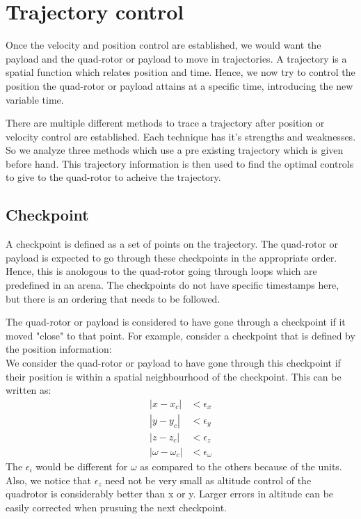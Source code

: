 \documentclass[BTech]{iitmdiss}
\begin{document}
\chapter{Trajectory control}

Once the velocity and position control are established, we would want the payload and the quad-rotor or payload to move in trajectories. A trajectory is a spatial function which relates position and time. Hence, we now try to control the position the quad-rotor or payload attains at a specific time, introducing the new variable time.

There are multiple different methods to trace a trajectory after position or velocity control are established. Each technique has it's strengths and weaknesses. So we analyze three methods which use a pre existing trajectory which is given before hand. This trajectory information is then used to find the optimal controls to give to the quad-rotor to acheive the trajectory.

\section{Checkpoint}

A checkpoint is defined as a set of points on the trajectory. The quad-rotor or payload is expected to go through these checkpoints in the appropriate order. Hence, this is anologous to the quad-rotor going through loops which are predefined in an arena. The checkpoints do not have specific timestamps here, but there is an ordering that needs to be followed.

The quad-rotor or payload is considered to have gone through a checkpoint if it moved "close" to that point. For example, consider a checkpoint that is defined by the position information:
\begin{equation}
  [x_c, y_c, z_y, \omega_c]
\end{equation}
We consider the quad-rotor or payload to have gone through this checkpoint if their position is within a spatial neighbourhood of the checkpoint. This can be written as:
\begin{equation} \begin{split}
  |x - x_c| &< \epsilon_x \\
  |y - y_c| &< \epsilon_y \\
  |z - z_c| &< \epsilon_z \\
  |\omega - \omega_c| &< \epsilon_\omega
\end{split} \end{equation}
The $\epsilon_i$ would be different for $\omega$ as compared to the others because of the units. Also, we notice that $\epsilon_z$ need not be very small as altitude control of the quadrotor is considerably better than x or y. Larger errors in altitude can be easily corrected when prusuing the next checkpoint.
\end{document}
